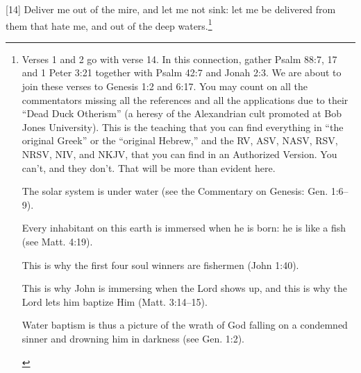 [14] \textcolor[rgb]{0.00,0.00,1.00}{Deliver me out of the mire, and let me not sink: let me be delivered from them that hate me, and out of the deep waters.}\footnote{Verses 1 and 2 go with verse 14. In this
connection, gather Psalm 88:7, 17 and 1 Peter 3:21 together with Psalm 42:7 and Jonah 2:3. We
are about to join these verses to Genesis 1:2 and 6:17. You may count on all the commentators
missing all the references and all the applications due to their “Dead Duck Otherism” (a heresy of
the Alexandrian cult promoted at Bob Jones University). This is the teaching that you can find
everything in “the original Greek” or the “original Hebrew,” and the RV, ASV, NASV, RSV, NRSV,
NIV, and NKJV, that you can find in an
Authorized Version. You can’t, and they don’t.
That will be more than evident here. \cite{Ruckman1992Psalms} 
\begin{compactenum}
\item The solar system is under water (see the Commentary on Genesis: Gen. 1:6–9).
\item Every inhabitant on this earth is immersed when he is born: he is like a fish (see Matt.
4:19).
\item This is why the first four soul winners are fishermen (John 1:40).
\item This is why John is immersing when the Lord shows up, and this is why the Lord lets him baptize Him (Matt. 3:14–15).
\item Water baptism is thus a picture of the wrath of God falling on a condemned sinner and drowning him in darkness (see Gen. 1:2). 

\end{compactenum}}
